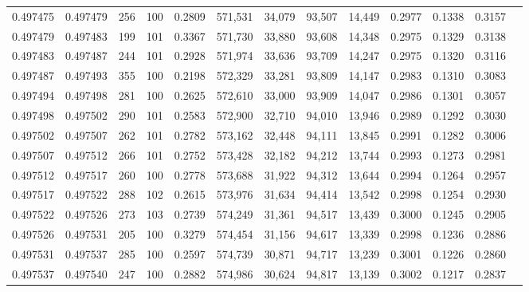 \begin{tabular}{rrrrrrrrrrrrr}
0.497475 & 0.497479 &   256 & 100 &                                     0.2809 & 571,531 &  34,079 &  93,507 &  14,449 & 0.2977 & 0.1338 & 0.3157 \\
0.497479 & 0.497483 &   199 & 101 &                                     0.3367 & 571,730 &  33,880 &  93,608 &  14,348 & 0.2975 & 0.1329 & 0.3138 \\
0.497483 & 0.497487 &   244 & 101 &                                     0.2928 & 571,974 &  33,636 &  93,709 &  14,247 & 0.2975 & 0.1320 & 0.3116 \\
0.497487 & 0.497493 &   355 & 100 &                                     0.2198 & 572,329 &  33,281 &  93,809 &  14,147 & 0.2983 & 0.1310 & 0.3083 \\
0.497494 & 0.497498 &   281 & 100 &                                     0.2625 & 572,610 &  33,000 &  93,909 &  14,047 & 0.2986 & 0.1301 & 0.3057 \\
0.497498 & 0.497502 &   290 & 101 &                                     0.2583 & 572,900 &  32,710 &  94,010 &  13,946 & 0.2989 & 0.1292 & 0.3030 \\
0.497502 & 0.497507 &   262 & 101 &                                     0.2782 & 573,162 &  32,448 &  94,111 &  13,845 & 0.2991 & 0.1282 & 0.3006 \\
0.497507 & 0.497512 &   266 & 101 &                                     0.2752 & 573,428 &  32,182 &  94,212 &  13,744 & 0.2993 & 0.1273 & 0.2981 \\
0.497512 & 0.497517 &   260 & 100 &                                     0.2778 & 573,688 &  31,922 &  94,312 &  13,644 & 0.2994 & 0.1264 & 0.2957 \\
0.497517 & 0.497522 &   288 & 102 &                                     0.2615 & 573,976 &  31,634 &  94,414 &  13,542 & 0.2998 & 0.1254 & 0.2930 \\
0.497522 & 0.497526 &   273 & 103 &                                     0.2739 & 574,249 &  31,361 &  94,517 &  13,439 & 0.3000 & 0.1245 & 0.2905 \\
0.497526 & 0.497531 &   205 & 100 &                                     0.3279 & 574,454 &  31,156 &  94,617 &  13,339 & 0.2998 & 0.1236 & 0.2886 \\
0.497531 & 0.497537 &   285 & 100 &                                     0.2597 & 574,739 &  30,871 &  94,717 &  13,239 & 0.3001 & 0.1226 & 0.2860 \\
0.497537 & 0.497540 &   247 & 100 &                                     0.2882 & 574,986 &  30,624 &  94,817 &  13,139 & 0.3002 & 0.1217 & 0.2837 \\

\end{tabular}

